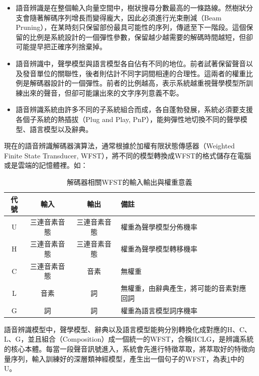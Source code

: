 \begin{itemize}
\itemsep -2pt %
  \item 語音辨識是在整個輸入向量空間中，樹狀搜尋分數最高的一條路線。然樹狀分支會隨著解碼序列增長而變得龐大，因此必須進行光束刪減（Beam Pruning），在某時刻只保留部份最具可能性的序列，傳遞至下一階段。這個保留的比例是系統設計的一個彈性參數，保留越少越需要的解碼時間越短，但卻可能提早把正確序列捨棄掉。

 \item 語音辨識中，聲學模型與語言模型各自佔有不同的地位。前者試著保留聲音以及發音單位的關聯性，後者則估計不同字詞間相連的合理性。這兩者的權重比例是解碼器設計的一個彈性。前者的比例越高，表示系統越重視聲學模型所訓練出來的聲音，但卻可能讓出來的文字序列意義不彰。

 \item 語音辨識系統由許多不同的子系統組合而成，各自蓬勃發展，系統必須要支援各個子系統的熱插拔（Plug and Play, PnP），能夠彈性地切換不同的聲學模型、語言模型以及辭典。
\end{itemize}

現在的語音辨識解碼器演算法，通常根據於加權有限狀態傳感器（Weighted Finite State Transducer, WFST），將不同的模型轉換成WFST的格式儲存在電腦或是雲端的記憶體裡。如：



\begin{table}[htbp]
\centering
\begin{tabular}{|cccl|}
\hline
 代號 & 輸入 & 輸出 & 備註 \\
\hline
 U    & 三連音素音態 & 三連音素音態 & 權重為聲學模型分佈機率 \\
\hline
 H    & 三連音素音態 & 三連音素音態 & 權重為聲學模型轉移機率 \\
\hline 
 C    & 三連音素音態 & 音素 & 無權重  \\
\hline
 L    & 音素 & 詞 & 無權重，由辭典產生，將可能的音素對應回詞 \\
\hline
 G    & 詞 & 詞 & 權重為語言模型詞序機率   \\
\hline

\end{tabular}
\caption{解碼器相關WFST的輸入輸出與權重意義}
\label{table:chap3_wfst}
\end{table}

語音辨識模型中，聲學模型、辭典以及語言模型能夠分別轉換化成對應的H、C、L、G，並且組合（Composition）成一個統一的WFST，合稱HCLG，是辨識系統的核心本體。每當一段聲音訊號進入，系統會先進行特徵萃取，將萃取好的特徵向量序列，輸入訓練好的深層類神經模型，產生出一個句子的WFST，為表\ref{table:chap3_wfst}中的U。


